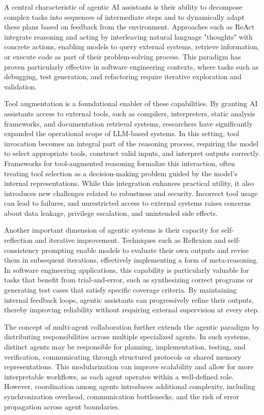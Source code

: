 A central characteristic of agentic AI assistants is their ability to decompose complex tasks into sequences of intermediate steps and to dynamically adapt these plans based on feedback from the environment. Approaches such as ReAct integrate reasoning and acting by interleaving natural language "thoughts" with concrete actions, enabling models to query external systems, retrieve information, or execute code as part of their problem-solving process. \cite{yao2022react} This paradigm has proven particularly effective in software engineering contexts, where tasks such as debugging, test generation, and refactoring require iterative exploration and validation.

Tool augmentation is a foundational enabler of these capabilities. By granting AI assistants access to external tools, such as compilers, interpreters, static analysis frameworks, and documentation retrieval systems, researchers have significantly expanded the operational scope of LLM-based systems. In this setting, tool invocation becomes an integral part of the reasoning process, requiring the model to select appropriate tools, construct valid inputs, and interpret outputs correctly. Frameworks for tool-augmented reasoning formalize this interaction, often treating tool selection as a decision-making problem guided by the model's internal representations. \cite{schick2023toolformer} While this integration enhances practical utility, it also introduces new challenges related to robustness and security. Incorrect tool usage can lead to failures, and unrestricted access to external systems raises concerns about data leakage, privilege escalation, and unintended side effects.

Another important dimension of agentic systems is their capacity for self-reflection and iterative improvement. Techniques such as Reflexion and self-consistency prompting enable models to evaluate their own outputs and revise them in subsequent iterations, effectively implementing a form of meta-reasoning. \cite{shinn2023reflexion} In software engineering applications, this capability is particularly valuable for tasks that benefit from trial-and-error, such as synthesizing correct programs or generating test cases that satisfy specific coverage criteria. By maintaining internal feedback loops, agentic assistants can progressively refine their outputs, thereby improving reliability without requiring external supervision at every step.

The concept of multi-agent collaboration further extends the agentic paradigm by distributing responsibilities across multiple specialized agents. In such systems, distinct agents may be responsible for planning, implementation, testing, and verification, communicating through structured protocols or shared memory representations. \cite{hong2023metagpt} This modularization can improve scalability and allow for more interpretable workflows, as each agent operates within a well-defined role. However, coordination among agents introduces additional complexity, including synchronization overhead, communication bottlenecks, and the risk of error propagation across agent boundaries.


